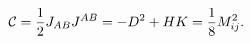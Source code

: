 \begin{equation}
{\cal C}=\frac{1}{2}J_{AB}J^{AB}=-D^2+HK=\frac{1}{8}
M_{ij}^2.
\label{casimir}
\end{equation}

